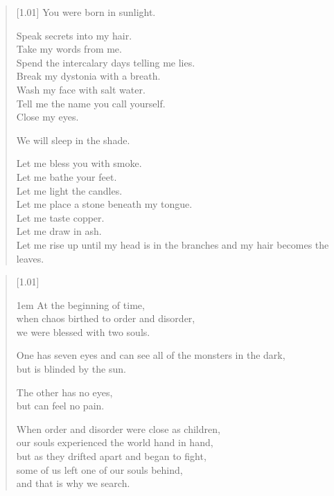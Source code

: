 \begin{paracol}{2}
\begin{verse}[1.01\textwidth]
    You were born in sunlight.\vspace{-7pt}

    Speak secrets into my hair.\\
    Take my words from me.\\
    Spend the intercalary days telling me lies.\\
    Break my dystonia with a breath.\\
    Wash my face with salt water.\\
    Tell me the name you call yourself.\\
    Close my eyes.\vspace{-7pt}

    We will sleep in the shade.\vspace{-7pt}

    Let me bless you with smoke.\\
    Let me bathe your feet.\\
    Let me light the candles.\\
    Let me place a stone beneath my tongue.\\
    Let me taste copper.\\
    Let me draw in ash.\\
    Let me rise up until my head is in the branches and my hair becomes the leaves.
\end{verse}
\newpage

\null
\vfill
\begin{verse}[1.01\textwidth]
    {\vgap1em
    At the beginning of time,\\
    \vin \vin when chaos birthed to order and disorder,\\
    we were blessed with two souls.

    One has seven eyes and can see all of the monsters in the dark,\\
    \vin \vin but is blinded by the sun.

    The other has no eyes,\\
    \vin \vin but can feel no pain.

    When order and disorder were close as children,\\
    \vin our souls experienced the world hand in hand,\\
    \vin \vin but as they drifted apart and began to fight,\\
    \vin \vin \vin some of us left one of our souls behind,\\
    \vin \vin \vin \vin and that is why we search.
    }
\end{verse}
\vfill
\newpage


\end{paracol}
